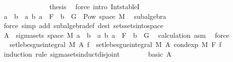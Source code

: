 \begin{isabellebody}
\ \ \ \ \ \ \isacommand{{\isacharbraceright}{\kern0pt}}\isamarkupfalse%
\isanewline
\ \ \ \ \ \ \isamarkupfalse%
\ {\isacharquery}{\kern0pt}thesis\ \isamarkupfalse%
\ {\isacharparenleft}{\kern0pt}force\ intro{\isacharbang}{\kern0pt}{\isacharcolon}{\kern0pt}\ Int{\isacharunderscore}{\kern0pt}stableI{\isacharparenright}{\kern0pt}\isanewline
\ \ \ \ \isamarkupfalse%
\isanewline
\ \ \ \ \isamarkupfalse%
\ \isamarkupfalse%
\ {\isachardoublequoteopen}{\isacharbraceleft}{\kern0pt}a\ {\isasyminter}\ b\ {\isacharbar}{\kern0pt}\ a\ b{\isachardot}{\kern0pt}\ a\ {\isasymin}\ F\ {\isasymand}\ b\ {\isasymin}\ G{\isacharbraceright}{\kern0pt}\ {\isasymsubseteq}\ Pow\ {\isacharparenleft}{\kern0pt}space\ M{\isacharparenright}{\kern0pt}{\isachardoublequoteclose}\ \isamarkupfalse%
\ subalgebra\ \isamarkupfalse%
\ {\isacharparenleft}{\kern0pt}force\ simp\ add{\isacharcolon}{\kern0pt}\ subalgebra{\isacharunderscore}{\kern0pt}def\ dest{\isacharcolon}{\kern0pt}\ sets{\isachardot}{\kern0pt}sets{\isacharunderscore}{\kern0pt}into{\isacharunderscore}{\kern0pt}space{\isacharparenright}{\kern0pt}\isanewline
\ \ \ \ \isamarkupfalse%
\ \isamarkupfalse%
\ {\isachardoublequoteopen}A\ {\isasymin}\ sigma{\isacharunderscore}{\kern0pt}sets\ {\isacharparenleft}{\kern0pt}space\ M{\isacharparenright}{\kern0pt}\ {\isacharbraceleft}{\kern0pt}a\ {\isasyminter}\ b\ {\isacharbar}{\kern0pt}\ a\ b{\isachardot}{\kern0pt}\ a\ {\isasymin}\ F\ {\isasymand}\ b\ {\isasymin}\ G{\isacharbraceright}{\kern0pt}{\isachardoublequoteclose}\ \isamarkupfalse%
\ calculation\ asm\ \isamarkupfalse%
\ force\isanewline
\ \ \ \ \isamarkupfalse%
\ \isamarkupfalse%
\ {\isachardoublequoteopen}set{\isacharunderscore}{\kern0pt}lebesgue{\isacharunderscore}{\kern0pt}integral\ M\ A\ f\ {\isacharequal}{\kern0pt}\ set{\isacharunderscore}{\kern0pt}lebesgue{\isacharunderscore}{\kern0pt}integral\ M\ A\ {\isacharparenleft}{\kern0pt}cond{\isacharunderscore}{\kern0pt}exp\ M\ F\ f{\isacharparenright}{\kern0pt}{\isachardoublequoteclose}\isanewline
\ \ \ \ \isamarkupfalse%
\ {\isacharparenleft}{\kern0pt}induction\ rule{\isacharcolon}{\kern0pt}\ sigma{\isacharunderscore}{\kern0pt}sets{\isacharunderscore}{\kern0pt}induct{\isacharunderscore}{\kern0pt}disjoint{\isacharparenright}{\kern0pt}\isanewline
\ \ \ \ \ \ \isamarkupfalse%
\ {\isacharparenleft}{\kern0pt}basic\ A{\isacharparenright}{\kern0pt}\isanewline

\end{isabellebody}
